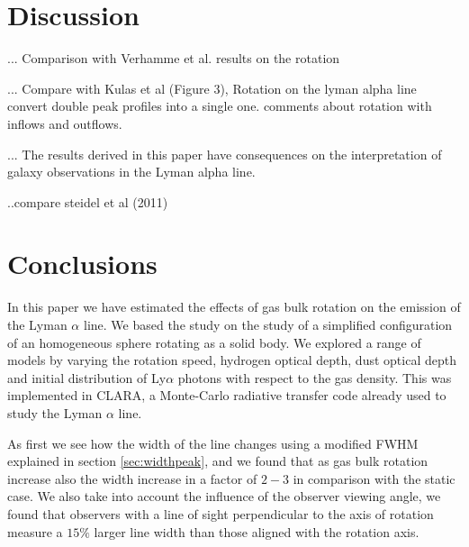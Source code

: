 \documentclass[usenatbib]{mn2e}
\begin{document}


\section{Discussion}
\label{sec:discussion}

... Comparison with Verhamme et al. results on the rotation


... Compare with Kulas et al (Figure 3), Rotation on the lyman alpha
line convert double peak profiles into a single one. comments about
rotation with inflows and outflows.   

... The results derived in this paper have consequences on the
interpretation of galaxy observations in the Lyman alpha line.

..compare steidel et al (2011) 





\section{Conclusions}
\label{sec:conclusions}
In this paper we have estimated the effects of gas bulk rotation on
the emission  of the Lyman $\alpha$ line. We based the study on the
study of a simplified configuration of an homogeneous sphere rotating
as a solid body. We explored  a range of models by varying the
rotation speed, hydrogen optical depth, dust optical depth and initial
distribution of Ly$\alpha$ photons with respect to the gas
density. This was implemented in CLARA, a Monte-Carlo
radiative transfer code already used to study the Lyman $\alpha$
line. 

As first we see how the width of the line changes using a modified FWHM
explained in section \ref{sec:widthpeak}, and we found that as gas bulk 
rotation increase also the width increase in a factor of $2-3$ in comparison 
with the static case. We also take into account the influence of the observer 
viewing angle, we found that observers with a line of sight perpendicular  
to the axis of rotation measure a $15\%$ larger line width than those 
aligned with the rotation axis.
\end{document}
